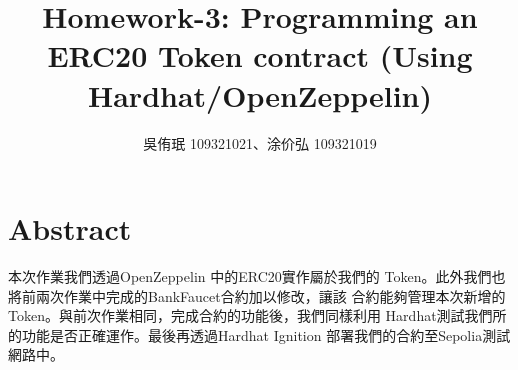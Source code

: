 \documentclass[12pt,a4paper]{article}
\title{Homework-3: Programming an ERC20 Token contract (Using Hardhat/OpenZeppelin)}
\author{吳侑珉 109321021、涂价弘 109321019}
\begin{document}
 \date{} \maketitle

\tableofcontents

\pagebreak

\section{Abstract}

本次作業我們透過OpenZeppelin\cite{openzeppelin} 中的ERC20實作屬於我們的
\cite{erc-20} Token。此外我們也將前兩次作業中完成的BankFaucet合約加以修改，讓該
合約能夠管理本次新增的Token。與前次作業相同，完成合約的功能後，我們同樣利用
Hardhat測試我們所的功能是否正確運作。最後再透過Hardhat Ignition
\cite{hardhat-ignition}部署我們的合約至Sepolia測試網路中。






\pagebreak
\printbibliography
\end{document}

